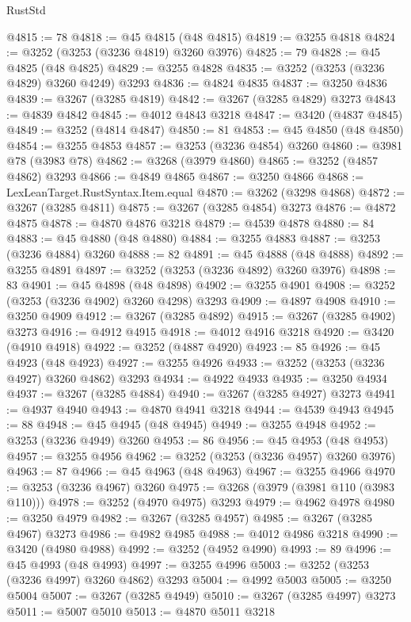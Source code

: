 \begin{lexlean}{RustStd}
\begin{coremodule}
{\begin{coremodule}
{{{{{{{{{{{{{{{{{{{{{{{{{{{{{{{{{{{{{{{@4815 := 78
@4818 := @45 @4815 (@48 @4815)
@4819 := @3255 @4818
@4824 := @3252 (@3253 (@3236 @4819) @3260 @3976)
@4825 := 79
@4828 := @45 @4825 (@48 @4825)
@4829 := @3255 @4828
@4835 := @3252 (@3253 (@3236 @4829) @3260 @4249) @3293
@4836 := @4824 @4835
@4837 := @3250 @4836
@4839 := @3267 (@3285 @4819)
@4842 := @3267 (@3285 @4829) @3273
@4843 := @4839 @4842
@4845 := @4012 @4843 @3218
@4847 := @3420 (@4837 @4845)
@4849 := @3252 (@4814 @4847)
@4850 := 81
@4853 := @45 @4850 (@48 @4850)
@4854 := @3255 @4853
@4857 := @3253 (@3236 @4854) @3260
@4860 := @3981 @78 (@3983 @78)
@4862 := @3268 (@3979 @4860)
@4865 := @3252 (@4857 @4862) @3293
@4866 := @4849 @4865
@4867 := @3250 @4866
@4868 := LexLeanTarget.RustSyntax.Item.equal
@4870 := @3262 (@3298 @4868)
@4872 := @3267 (@3285 @4811)
@4875 := @3267 (@3285 @4854) @3273
@4876 := @4872 @4875
@4878 := @4870 @4876 @3218
@4879 := @4539 @4878
@4880 := 84
@4883 := @45 @4880 (@48 @4880)
@4884 := @3255 @4883
@4887 := @3253 (@3236 @4884) @3260
@4888 := 82
@4891 := @45 @4888 (@48 @4888)
@4892 := @3255 @4891
@4897 := @3252 (@3253 (@3236 @4892) @3260 @3976)
@4898 := 83
@4901 := @45 @4898 (@48 @4898)
@4902 := @3255 @4901
@4908 := @3252 (@3253 (@3236 @4902) @3260 @4298) @3293
@4909 := @4897 @4908
@4910 := @3250 @4909
@4912 := @3267 (@3285 @4892)
@4915 := @3267 (@3285 @4902) @3273
@4916 := @4912 @4915
@4918 := @4012 @4916 @3218
@4920 := @3420 (@4910 @4918)
@4922 := @3252 (@4887 @4920)
@4923 := 85
@4926 := @45 @4923 (@48 @4923)
@4927 := @3255 @4926
@4933 := @3252 (@3253 (@3236 @4927) @3260 @4862) @3293
@4934 := @4922 @4933
@4935 := @3250 @4934
@4937 := @3267 (@3285 @4884)
@4940 := @3267 (@3285 @4927) @3273
@4941 := @4937 @4940
@4943 := @4870 @4941 @3218
@4944 := @4539 @4943
@4945 := 88
@4948 := @45 @4945 (@48 @4945)
@4949 := @3255 @4948
@4952 := @3253 (@3236 @4949) @3260
@4953 := 86
@4956 := @45 @4953 (@48 @4953)
@4957 := @3255 @4956
@4962 := @3252 (@3253 (@3236 @4957) @3260 @3976)
@4963 := 87
@4966 := @45 @4963 (@48 @4963)
@4967 := @3255 @4966
@4970 := @3253 (@3236 @4967) @3260
@4975 := @3268 (@3979 (@3981 @110 (@3983 @110)))
@4978 := @3252 (@4970 @4975) @3293
@4979 := @4962 @4978
@4980 := @3250 @4979
@4982 := @3267 (@3285 @4957)
@4985 := @3267 (@3285 @4967) @3273
@4986 := @4982 @4985
@4988 := @4012 @4986 @3218
@4990 := @3420 (@4980 @4988)
@4992 := @3252 (@4952 @4990)
@4993 := 89
@4996 := @45 @4993 (@48 @4993)
@4997 := @3255 @4996
@5003 := @3252 (@3253 (@3236 @4997) @3260 @4862) @3293
@5004 := @4992 @5003
@5005 := @3250 @5004
@5007 := @3267 (@3285 @4949)
@5010 := @3267 (@3285 @4997) @3273
@5011 := @5007 @5010
@5013 := @4870 @5011 @3218
}}}}}}}}}}}}}}}}}}}}}}}}}}}}}}}}}}}}}}}
\end{coremodule}}
\end{coremodule}
\end{lexlean}
